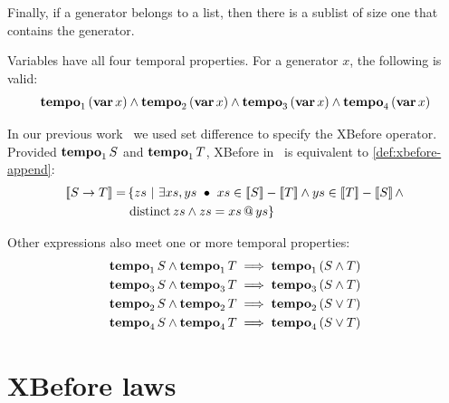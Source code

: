 \documentclass[12pt,openright,twoside,a4paper,oldfontcommands,english,brazil,final]{abntex2}
\makeatletter
\newtheorem{definition}{Definition}[chapter]
\theoremstyle{theo}
\newcommand{\distinctlist}{%
  distinct list\footnote{Although some may use the terminology ``disjoint list'' to call a list of non-repeated elements, we use the same terminology (distinct list) of the theories built-in the \isabellehol tool.}%
  \global\renewcommand{\distinctlist}{distinct list}%
  \global\renewcommand{\distinctlists}{distinct lists}%
}
\newcommand{\distinctlists}{%
  distinct lists\footnote{Although some may use the terminology ``disjoint lists'' to call the lists of non-repeated elements, we use the same terminology (distinct lists) of the theories built-in the \isabellehol tool.}%
  \global\renewcommand{\distinctlist}{distinct list\xspace}%
  \global\renewcommand{\distinctlists}{distinct lists\xspace}%
  \xspace%
}
\newcommand{\isabellehol}[1][]{%
  Isabelle/HOL{#1}\index{Isabelle/HOL}~2015\footnote{The 2002 tutorial is reported in~\cite{NPW2002}, but there is a newer version published with the tool itself.
  The tool and the tutorial are available on their website at \url{http://isabelle.in.tum.de}.}%
  \global\renewcommand{\isabellehol}[1][]{Isabelle/HOL{#1}\index{Isabelle/HOL}\xspace}\xspace %
}
\def\varop{\ensuremath\operatorname{\mathbf{var}}}
\newcommand{\var}[1]{\ensuremath\varop #1}
\def\xbeforeop{\ensuremath\rightarrow}
\newcommand{\xbefore}[2]{\ensuremath #1 \xbeforeop #2 }
\def\Tempotext{Tempo\xspace}
\def\tempoop{\ensuremath\operatorname{\mathbf{tempo}}}
\newcommand{\tempo}[2][1-4]{\ensuremath\tempoop_{#1} #2}
\def\distinctop{\ensuremath\operatorname{distinct}}
\newcommand{\distinct}[1]{\ensuremath\distinctop #1}
\newcommand{\append}[2]{\ensuremath #1 \operatorname{\mathbf{@}} #2}
\newcommand{\parsin}[1]{\ensuremath\left( #1 \right)}
\newcommand{\denote}[1]{\ensuremath\left[\!\left[#1\right]\!\right]}
\makeatother
\begin{document}
Finally, if a generator belongs to a list, then there is a sublist of size one that contains the generator.
%
%

Variables have all four temporal properties. For a generator $x$, the following is valid:
%
\begin{equation}
\label{law:var-tempo}
\tempo[1]{\left(\var{x}\right)} \land
\tempo[2]{\left(\var{x}\right)} \land
\tempo[3]{\left(\var{x}\right)} \land
\tempo[4]{\left(\var{x}\right)}
\end{equation}

\begin{sloppypar}
In our previous work~\cite{DM2015} we used set difference to specify the \ac{XBefore} operator.
Provided $\tempo[1]{S}$ and $\tempo[1]{T}$, \ac{XBefore} in~\cite{DM2015} is equivalent to \eqref{def:xbefore-append}:
%
\begin{align}
\denote{\xbefore{S}{T}} = &\left\{ zs ~\middle|~ \exists xs, ys ~\bullet~ xs \in \denote{S}-\denote{T} \land ys \in \denote{T}-\denote{S} \land \right.\nonumber\\
& \left. \distinct{zs} \land zs = \append{xs}{ys} \right\}\label{law:old-xbefore}
\end{align}
\end{sloppypar}

Other expressions also meet one or more temporal properties:
\begin{subequations}
\begin{align}
\tempo[1]{S} \land \tempo[1]{T} & \implies \tempo[1]{\parsin{S \land T}}\label{law:tempo1-inter}\\
\tempo[3]{S} \land \tempo[3]{T} & \implies \tempo[3]{\parsin{S \land T}}\label{law:tempo3-inter}\\
\tempo[2]{S} \land \tempo[2]{T} & \implies \tempo[2]{\parsin{S \lor T}}\label{law:tempo2-union}\\
\tempo[4]{S} \land \tempo[4]{T} & \implies \tempo[4]{\parsin{S \lor T}}\label{law:tempo4-union}
\end{align}
\end{subequations}

\section{\acs*{XBefore} laws}
\label{sec:xbefore-laws}
\end{document}
